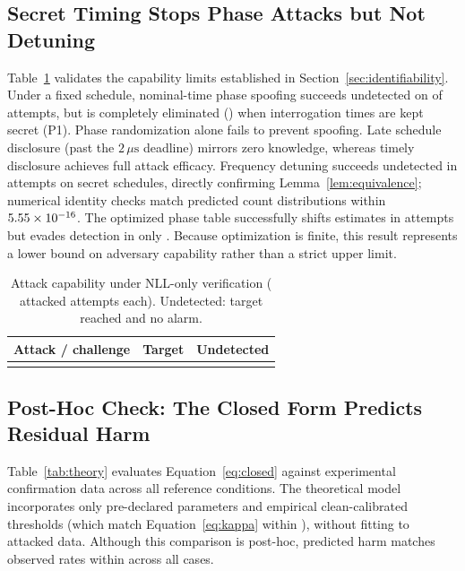 \documentclass[conference]{IEEEtran}
\begin{document}
\subsection{Secret Timing Stops Phase Attacks but Not Detuning}
\label{sec:results-capability}

Table~\ref{tab:capability} validates the capability limits established in Section~\ref{sec:identifiability}. Under a fixed schedule, nominal-time phase spoofing succeeds undetected on \FixedU{} of \TotalN{} attempts, but is completely eliminated (\HiddenU{}) when interrogation times are kept secret (P1). Phase randomization alone fails to prevent spoofing. Late schedule disclosure (past the $2\,\mu\text{s}$ deadline) mirrors zero knowledge, whereas timely disclosure achieves full attack efficacy. Frequency detuning succeeds undetected in \FrequencyU{} attempts on secret schedules, directly confirming Lemma~\ref{lem:equivalence}; numerical identity checks match predicted count distributions within $5.55\times 10^{-16}$. The optimized phase table successfully shifts estimates in \OptimizedT{} attempts but evades detection in only \OptimizedU{}. Because optimization is finite, this result represents a lower bound on adversary capability rather than a strict upper limit.

\begin{table}[t]
\centering
\caption{Attack capability under NLL-only verification (\TotalN{} attacked attempts each). Undetected: target reached and no alarm.}
\label{tab:capability}
\footnotesize
\begin{tabular}{@{}lrr@{}}
\toprule
Attack / challenge & Target & Undetected \\
\midrule

\\
\bottomrule
\end{tabular}
\end{table}

\subsection{Post-Hoc Check: The Closed Form Predicts Residual Harm}
\label{sec:results-reference}

Table~\ref{tab:theory} evaluates Equation~\eqref{eq:closed} against experimental confirmation data across all \TheoryConditions{} reference conditions. The theoretical model incorporates only pre-declared parameters and empirical clean-calibrated thresholds (which match Equation~\eqref{eq:kappa} within \TheoryKappaGap{}), without fitting to attacked data. Although this comparison is post-hoc, predicted harm matches observed rates within \TheoryMaxGap{} across all cases.
\end{document}
